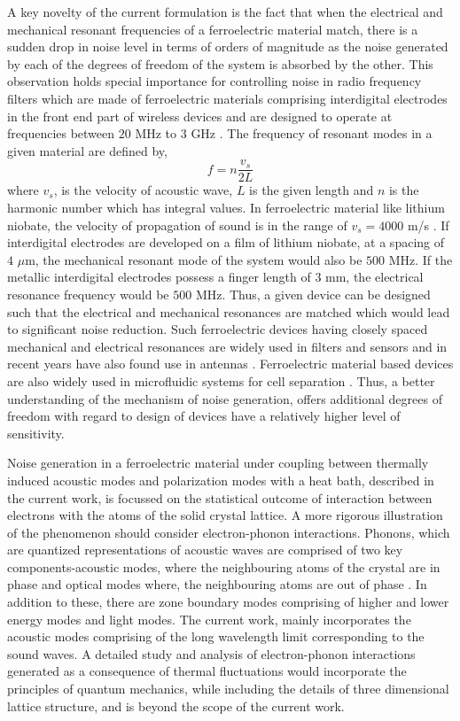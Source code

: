 \documentclass[12pt,column,showpacs,pre,preprintnumbers,amsmath,amssymb,aps,standalone]{revtex4-2}
\begin{document}
A key novelty of the current formulation is the fact that when the electrical and mechanical resonant frequencies of a ferroelectric material match, there is a sudden drop in noise level in terms of orders of magnitude as the noise generated by each of the degrees of freedom of the system is absorbed by the other. This observation holds  special importance for controlling noise in radio frequency filters which are made of ferroelectric materials comprising interdigital electrodes in the front end part of wireless devices and are designed to operate at frequencies between $20$ MHz to $3$ GHz \cite{25, 26}.
The frequency of resonant modes in a given material are defined by,
\begin{equation}\label{e19}
f=n\frac{v_s}{2L}
\end{equation}
where $ v_s $, is the velocity of acoustic wave, $L$ is the given length and $n$ is the harmonic number which has integral values. 
 In ferroelectric material like lithium niobate, the velocity of propagation of sound is in the range of $v_s=4000$ m/s \cite{27,28,29}.  If interdigital electrodes are developed on a film of lithium niobate, at a spacing of $ 4$ $ \mu $m, the mechanical resonant mode of the system would also be $ 500 $ MHz.  If the metallic interdigital electrodes possess a finger length of $3$ mm, the electrical resonance frequency would be $500$ MHz. Thus, a given device can be designed such that the electrical and mechanical resonances are matched which would lead to significant noise reduction. Such ferroelectric devices having closely spaced mechanical and electrical resonances are widely used in filters and sensors \cite{14} and in recent years have also found use in antennas \cite{30,31}. Ferroelectric material based devices are also widely used in microfluidic systems for cell separation \cite{32,33}. Thus, a better understanding of the mechanism of noise generation, offers additional degrees of freedom with regard to design of devices have a relatively higher level of sensitivity.
 
 Noise generation in a ferroelectric material under coupling between thermally induced acoustic modes and polarization modes with a heat bath, described in the current work, is focussed on the statistical outcome of interaction between electrons with the atoms of the solid crystal lattice. A more rigorous illustration of the phenomenon should consider electron-phonon interactions. Phonons, which are quantized representations of acoustic waves are comprised of two key components-acoustic modes, where the neighbouring atoms of the crystal are in phase and optical modes where, the neighbouring atoms are out of phase \cite{34}. In addition to these, there are zone boundary modes comprising of higher and lower energy modes and light modes. The current work, mainly incorporates the acoustic modes comprising of the long wavelength limit corresponding to the sound waves. A detailed study and analysis of electron-phonon interactions generated as a consequence of thermal fluctuations would incorporate the principles of quantum mechanics, while including the details of three dimensional lattice structure, and is beyond the scope of the current work.  
 	
\end{document}
